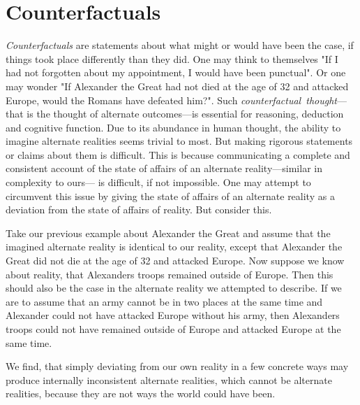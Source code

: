 \documentclass[a4paper,american,10pt]{paper}
\theoremstyle{definition}\newtheorem{definition}{Definition}
\begin{document}
\section{Counterfactuals}\label{sec:counterfactuals}
\textit{Counterfactuals} are statements about what might or would have been the case, if things took place differently than they did. One may think to themselves "If I had not forgotten about my appointment, I would have been punctual". Or one may wonder "If Alexander the Great had not died at the age of 32 and attacked Europe, would the Romans have defeated him?". Such \textit{counterfactual~thought}---that is the thought of alternate outcomes---is essential for reasoning, deduction and cognitive function. \cite{byrne_counterfactual_2016} Due to its abundance in human thought, the ability to imagine alternate realities seems trivial to most. But making rigorous statements or claims about them is difficult. This is because communicating a complete and consistent account of the state of affairs of an alternate reality---similar in complexity to ours--- is difficult, if not impossible. One may attempt to circumvent this issue by giving the state of affairs of an alternate reality as a deviation from the state of affairs of reality. But consider this.
\begin{examplef}
Take our previous example about Alexander the Great and assume that the imagined alternate reality is identical to our reality, except that Alexander the Great did not die at the age of 32 and attacked Europe. Now suppose we know about reality, that Alexanders troops remained outside of Europe. Then this should also be the case in the alternate reality we attempted to describe. If we are to assume that an army cannot be in two places at the same time and Alexander could not have attacked Europe without his army, then Alexanders troops could not have remained outside of Europe and attacked Europe at the same time.
\end{examplef}
We find, that simply deviating from our own reality in a few concrete ways may produce internally inconsistent alternate realities, which cannot be alternate realities, because they are not ways the world could have been.
\end{document}
